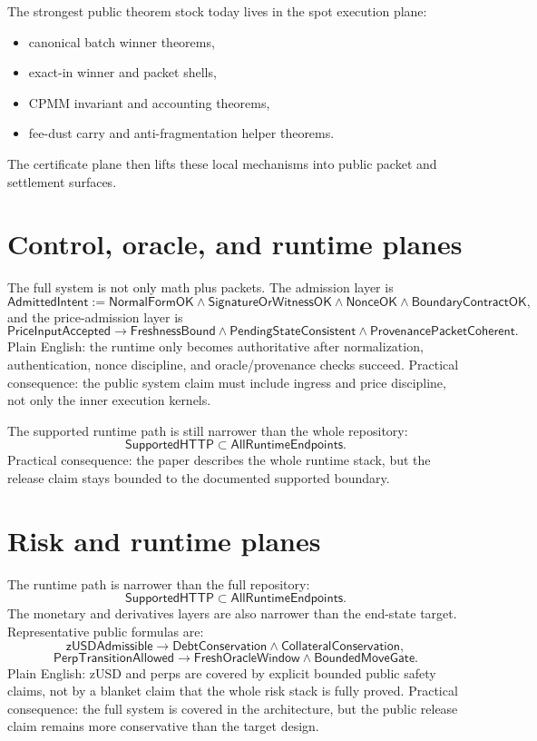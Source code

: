 \documentclass[9pt]{extarticle}
\begin{document}
The strongest public theorem stock today lives in the spot execution plane:
\begin{itemize}
  \item canonical batch winner theorems,
  \item exact-in winner and packet shells,
  \item CPMM invariant and accounting theorems,
  \item fee-dust carry and anti-fragmentation helper theorems.
\end{itemize}
The certificate plane then lifts these local mechanisms into public packet and
settlement surfaces.

\section{Control, oracle, and runtime planes}
The full system is not only math plus packets. The admission layer is
\[
\mathsf{AdmittedIntent}
:= \mathsf{NormalFormOK} \wedge \mathsf{SignatureOrWitnessOK}
\wedge \mathsf{NonceOK} \wedge \mathsf{BoundaryContractOK},
\]
and the price-admission layer is
\[
\mathsf{PriceInputAccepted}
\to \mathsf{FreshnessBound} \wedge \mathsf{PendingStateConsistent}
\wedge \mathsf{ProvenancePacketCoherent}.
\]
Plain English: the runtime only becomes authoritative after normalization,
authentication, nonce discipline, and oracle/provenance checks succeed.
Practical consequence: the public system claim must include ingress and price
discipline, not only the inner execution kernels.

The supported runtime path is still narrower than the whole repository:
\[
\mathsf{SupportedHTTP} \subset \mathsf{AllRuntimeEndpoints}.
\]
Practical consequence: the paper describes the whole runtime stack, but the
release claim stays bounded to the documented supported boundary.

\section{Risk and runtime planes}
The runtime path is narrower than the full repository:
\[
\mathsf{SupportedHTTP} \subset \mathsf{AllRuntimeEndpoints}.
\]
The monetary and derivatives layers are also narrower than the end-state target.
Representative public formulas are:
\[
\mathsf{zUSDAdmissible} \to \mathsf{DebtConservation} \wedge \mathsf{CollateralConservation},
\]
\[
\mathsf{PerpTransitionAllowed} \to \mathsf{FreshOracleWindow} \wedge \mathsf{BoundedMoveGate}.
\]
Plain English: zUSD and perps are covered by explicit bounded public safety
claims, not by a blanket claim that the whole risk stack is fully proved.
Practical consequence: the full system is covered in the architecture, but the
public release claim remains more conservative than the target design.
\end{document}
